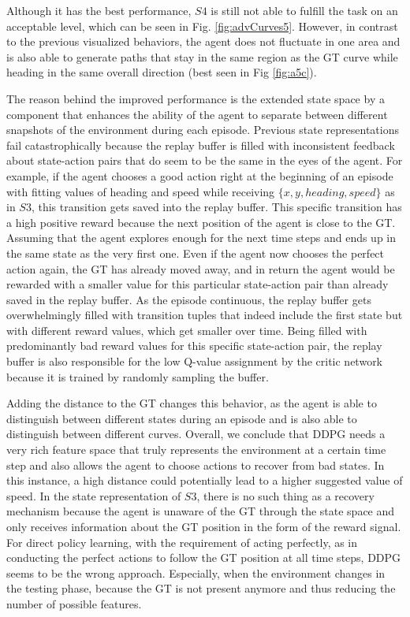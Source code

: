 Although it has the best performance, $S4$ is still not able to fulfill the task on an acceptable level, which can be seen in Fig. \ref{fig:advCurves5}. However, in contrast to the previous visualized behaviors, the agent does not fluctuate in one area and is also able to generate paths that stay in the same region as the GT curve while heading in the same overall direction (best seen in Fig \ref{fig:a5c}).
\par
The reason behind the improved performance is the extended state space by a component that enhances the ability of the agent to separate between different snapshots of the environment during each episode. Previous state representations fail catastrophically because the replay buffer is filled with inconsistent feedback about state-action pairs that do seem to be the same in the eyes of the agent. For example, if the agent chooses a good action right at the beginning of an episode with fitting values of heading and speed while receiving $\{x, y, heading, speed\}$ as in $S3$, this transition gets saved into the replay buffer. This specific transition has a high positive reward because the next position of the agent is close to the GT. Assuming that the agent explores enough for the next time steps and ends up in the same state as the very first one. Even if the agent now chooses the perfect action again, the GT has already moved away, and in return the agent would be rewarded with a smaller value for this particular state-action pair than already saved in the replay buffer. As the episode continuous, the replay buffer gets overwhelmingly filled with transition tuples that indeed include the first state but with different reward values, which get smaller over time. Being filled with predominantly bad reward values for this specific state-action pair, the replay buffer is also responsible for the low Q-value assignment by the critic network because it is trained by randomly sampling the buffer.
\par
Adding the distance to the GT changes this behavior, as the agent is able to distinguish between different states during an episode and is also able to distinguish between different curves. Overall, we conclude that DDPG needs a very rich feature space that truly represents the environment at a certain time step and also allows the agent to choose actions to recover from bad states. In this instance, a high distance could potentially lead to a higher suggested value of speed. In the state representation of $S3$, there is no such thing as a recovery mechanism because the agent is unaware of the GT through the state space and only receives information about the GT position in the form of the reward signal. For direct policy learning, with the requirement of acting perfectly, as in conducting the perfect actions to follow the GT position at all time steps, DDPG seems to be the wrong approach. Especially, when the environment changes in the testing phase, because the GT is not present anymore and thus reducing the number of possible features.
